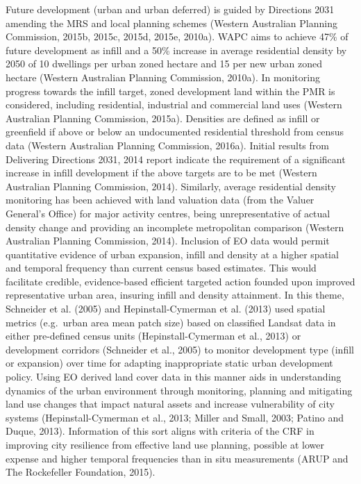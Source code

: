 \documentclass[]{book}
\begin{document}
Future development (urban and urban deferred) is guided by Directions
2031 amending the MRS and local planning schemes (Western Australian
Planning Commission, 2015b, 2015c, 2015d, 2015e, 2010a). WAPC aims to
achieve 47\% of future development as infill and a 50\% increase in
average residential density by 2050 of 10 dwellings per urban zoned
hectare and 15 per new urban zoned hectare (Western Australian Planning
Commission, 2010a). In monitoring progress towards the infill target,
zoned development land within the PMR is considered, including
residential, industrial and commercial land uses (Western Australian
Planning Commission, 2015a). Densities are defined as infill or
greenfield if above or below an undocumented residential threshold from
census data (Western Australian Planning Commission, 2016a). Initial
results from Delivering Directions 2031, 2014 report indicate the
requirement of a significant increase in infill development if the above
targets are to be met (Western Australian Planning Commission, 2014).
Similarly, average residential density monitoring has been achieved with
land valuation data (from the Valuer General's Office) for major
activity centres, being unrepresentative of actual density change and
providing an incomplete metropolitan comparison (Western Australian
Planning Commission, 2014). Inclusion of EO data would permit
quantitative evidence of urban expansion, infill and density at a higher
spatial and temporal frequency than current census based estimates. This
would facilitate credible, evidence-based efficient targeted action
founded upon improved representative urban area, insuring infill and
density attainment. In this theme, Schneider et al. (2005) and
Hepinstall-Cymerman et al. (2013) used spatial metrics (e.g.~urban area
mean patch size) based on classified Landsat data in either pre-defined
census units (Hepinstall-Cymerman et al., 2013) or development corridors
(Schneider et al., 2005) to monitor development type (infill or
expansion) over time for adapting inappropriate static urban development
policy. Using EO derived land cover data in this manner aids in
understanding dynamics of the urban environment through monitoring,
planning and mitigating land use changes that impact natural assets and
increase vulnerability of city systems (Hepinstall-Cymerman et al.,
2013; Miller and Small, 2003; Patino and Duque, 2013). Information of
this sort aligns with criteria of the CRF in improving city resilience
from effective land use planning, possible at lower expense and higher
temporal frequencies than in situ measurements (ARUP and The Rockefeller
Foundation, 2015).
\end{document}
